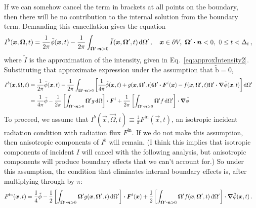 If we can somehow cancel the term in brackets at all points on the boundary,
then there will be no contribution to the internal solution from the boundary
term. Demanding this cancellation gives the equation
\begin{equation*}
  I^b( \bm{x}, \bm{\Omega}, t)
  =\frac{1}{2\pi} \tilde \phi( \bm{x}, t)
 - \frac{1}{2\pi} \int_{\bm{\Omega}' \bm{\cdot} \bm{n} > 0}
 \tilde I( \bm{x}, \bm{\Omega}', t) \mathop{}\!\mathrm{d}\Omega' \,,
 \quad \bm{x} \in \partial V, \ \bm{\Omega}' \bm{\cdot} \bm{n} < 0,
 \ 0 \le t < \Delta_t\,,
\end{equation*}
where $\tilde I$ is the approximation of the intensity, given in
Eq.~\eqref{eq:approxIntensity2}.
Substituting that approximate expression under the assumption that
$\mathrm{ \tilde b }=0$,
\begin{align*}
  I^b( \bm{x}, \bm{\Omega}, t)
  &=
 \frac{1}{2\pi} \tilde \phi( \bm{x}, t)
 - \frac{1}{2\pi} \int_{\bm{\Omega}' \bm{\cdot} \bm{n} > 0} \left[
 \frac{1}{4\pi} \tilde \phi(\bm{x}, t)
 + g(\bm{x}, \bm{\Omega}', t) \bm{\Omega}' \bm{\cdot} \bm{F}^i(\bm{x})
 - f(\bm{x}, \bm{\Omega}', t) \bm{\Omega}'\bm{\cdot} \bm{\nabla} \tilde\phi(\bm{x},t)
 \right] \mathop{}\!\mathrm{d}\Omega'
 \\
  &=
 \frac{1}{4\pi} \tilde\phi
 - \frac{1}{2\pi} \left[ \int_{\bm{\Omega}' \bm{\cdot} \bm{n} > 0} \bm{\Omega}'
 g\mathop{}\!\mathrm{d}\Omega \right]
 \bm{\cdot} \bm{F}^i
 + \frac{1}{2\pi} \left[ \int_{\bm{\Omega}' \bm{\cdot} \bm{n} > 0} \bm{\Omega}' f
 \mathop{}\!\mathrm{d}\Omega' \right]
  \bm{\cdot} \bm{\nabla}\tilde\phi
\end{align*}
To proceed, we assume that $I^b( \vec{x}, \vec{\Omega}, t)
\equiv \frac{1}{\pi} F^\mathrm{in}( \vec{x}, t)$, an isotropic incident radiation
condition with radiation flux $F^\mathrm{in}$. If we do not make this
assumption, then anisotropic components of $I^b$ will remain. (I
think this implies that isotropic components of incident $I$ will cancel with
the following analysis, but anisotropic components will produce boundary
effects that we can't account for.) So under this assumption, the condition
that eliminates internal boundary effects is, after multiplying through by
$\pi$:
\begin{equation} \label{eq:bndyElimCond}
  F^\mathrm{in}( \bm{x}, t) = 
 \frac{1}{4} \tilde\phi
 - \frac{1}{2} \left[ \int_{\bm{\Omega}' \bm{\cdot} \bm{n} > 0} \bm{\Omega}'
 g(\bm{x}, \bm{\Omega}', t) \mathop{}\!\mathrm{d}\Omega' \right]
 \bm{\cdot} \bm{F}^i(\bm{x})
 + \frac{1}{2} \left[ \int_{\bm{\Omega}' \bm{\cdot} \bm{n} > 0} \bm{\Omega}'
 f(\bm{x}, \bm{\Omega}', t) \mathop{}\!\mathrm{d}\Omega' \right]
 \bm{\cdot} \bm{\nabla}\tilde\phi(\bm{x}, t) \,.
\end{equation}

